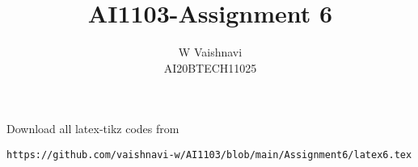 \documentclass[journal,12pt,twocolumn]{IEEEtran}
\DeclareMathOperator*{\Res}{Res}
\begin{document}
\newcommand{\BEQA}{\begin{eqnarray}}
\newcommand{\EEQA}{\end{eqnarray}}
\newcommand{\define}{\stackrel{\triangle}{=}}

\raggedbottom
\setlength{\parindent}{0pt}
\providecommand{\mbf}{\mathbf}
\providecommand{\pr}[1]{\ensuremath{\Pr\left(#1\right)}}
\providecommand{\qfunc}[1]{\ensuremath{Q\left(#1\right)}}
\providecommand{\sbrak}[1]{\ensuremath{{}\left[#1\right]}}
\providecommand{\lsbrak}[1]{\ensuremath{{}\left[#1\right.}}
\providecommand{\rsbrak}[1]{\ensuremath{{}\left.#1\right]}}
\providecommand{\brak}[1]{\ensuremath{\left(#1\right)}}
\providecommand{\lbrak}[1]{\ensuremath{\left(#1\right.}}
\providecommand{\rbrak}[1]{\ensuremath{\left.#1\right)}}
\providecommand{\cbrak}[1]{\ensuremath{\left\{#1\right\}}}
\providecommand{\lcbrak}[1]{\ensuremath{\left\{#1\right.}}
\providecommand{\rcbrak}[1]{\ensuremath{\left.#1\right\}}}
\newcommand\comb[2]{{}^{#1}\mathrm{C}_{#2}}
\theoremstyle{remark}
\newtheorem{rem}{Remark}
\newcommand{\sgn}{\mathop{\mathrm{sgn}}}
\providecommand{\abs}[1]{\vert#1\vert}
\providecommand{\res}[1]{\Res\displaylimits_{#1}} 
\providecommand{\norm}[1]{\lVert#1\rVert}
\providecommand{\mtx}[1]{\mathbf{#1}}
\providecommand{\mean}[1]{E[ #1 ]}
\providecommand{\fourier}{\overset{\mathcal{F}}{ \rightleftharpoons}}
\providecommand{\system}{\overset{\mathcal{H}}{ \longleftrightarrow}}
\newcommand{\solution}{\noindent \textbf{Solution: }}
\newcommand{\cosec}{\,\text{cosec}\,}
\providecommand{\dec}[2]{\ensuremath{\overset{#1}{\underset{#2}{\gtrless}}}}
\newcommand{\myvec}[1]{\ensuremath{\begin{pmatrix}#1\end{pmatrix}}}
\newcommand{\mydet}[1]{\ensuremath{\begin{vmatrix}#1\end{vmatrix}}}
\makeatletter
{}
\makeatother
\let\StandardTheFigure\thefigure
\let\vec\mathbf
\renewcommand{\thefigure}{\theproblem}
\def\putbox#1#2#3{\makebox[0in][l]{\makebox[#1][l]{}\raisebox{\baselineskip}[0in][0in]{\raisebox{#2}[0in][0in]{#3}}}}
     \def\rightbox#1{\makebox[0in][r]{#1}}
     \def\centbox#1{\makebox[0in]{#1}}
     \def\topbox#1{\raisebox{-\baselineskip}[0in][0in]{#1}}
     \def\midbox#1{\raisebox{-0.5\baselineskip}[0in][0in]{#1}}
\vspace{3cm}
\title{AI1103-Assignment 6}
\author{W Vaishnavi\\AI20BTECH11025}
\maketitle
\newpage
\bigskip
\renewcommand{\thefigure}{\theenumi}
\renewcommand{\thetable}{\theenumi}
Download all latex-tikz codes from 
%
\begin{lstlisting}
https://github.com/vaishnavi-w/AI1103/blob/main/Assignment6/latex6.tex
\end{lstlisting}
\end{document}
